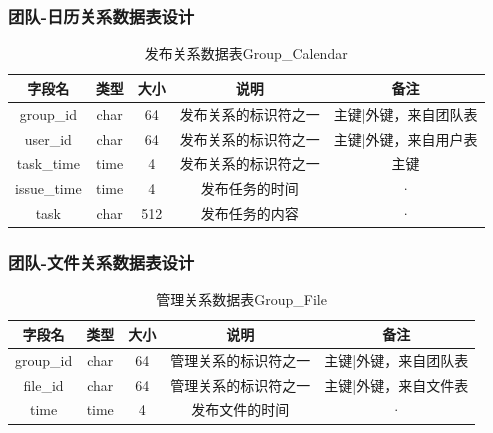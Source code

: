 \subsubsection{团队-日历关系数据表设计}
\begin{table}[htbp]
\centering
\caption{发布关系数据表Group\_Calendar} \label{tab:order-database}
\begin{tabular}{|c|c|c|c|c|}
    \hline
    字段名 & 类型 & 大小 & 说明 & 备注 \\
    \hline
    group\_id & char & 64 & 发布关系的标识符之一 & 主键|外键，来自团队表
    \\
    \hline
    user\_id & char & 64 & 发布关系的标识符之一 & 主键|外键，来自用户表
    \\
    \hline
    task\_time & time & 4 & 发布关系的标识符之一 & 主键\\
    \hline
    issue\_time & time & 4 & 发布任务的时间 & · \\
    \hline
    task & char & 512 & 发布任务的内容 & · \\  
    \hline
\end{tabular}
\end{table}
\newpage
\subsubsection{团队-文件关系数据表设计}
\begin{table}[htbp]
\centering
\caption{管理关系数据表Group\_File} \label{tab:order-database}
\begin{tabular}{|c|c|c|c|c|}
    \hline
    字段名 & 类型 & 大小 & 说明 & 备注 \\
    \hline
    group\_id & char & 64 & 管理关系的标识符之一 & 主键|外键，来自团队表
    \\
    \hline
    file\_id & char & 64 & 管理关系的标识符之一 & 主键|外键，来自文件表
    \\
    \hline
    time & time & 4 & 发布文件的时间 & · \\ 
    \hline
\end{tabular}
\end{table}
